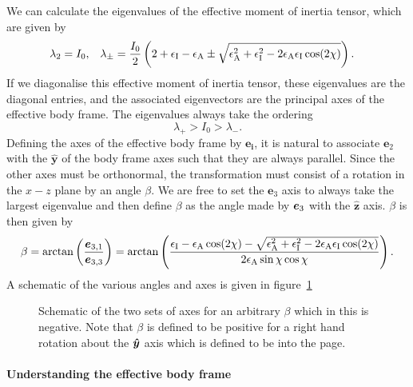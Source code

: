 \documentclass[../full_thesis/full_thesis.tex]{subfiles}
\newcommand{\thisdir}{../rotating_frame}
\begin{document}
We can calculate the eigenvalues of the effective moment of inertia tensor, which are given by
\begin{align}
\lambda_{2}=I_{0}, &&&
\lambda_{\pm}=\frac{I_{0}}{2}
\left(2+\epsilon_{\mathrm{I}}-\epsilon_{\mathrm{A}}\pm
\sqrt{\epsilon_{\mathrm{A}}^{2}+\epsilon_{\mathrm{I}}^{2}-2\epsilon_{\mathrm{A}}\epsilon_{\mathrm{I}}\cos(2\chi)}\right).
\end{align}
If we diagonalise this effective moment of inertia tensor, these eigenvalues
are the diagonal entries, and the associated eigenvectors are the principal
axes of the effective body frame. The eigenvalues always take the ordering
\begin{equation}
\lambda_{+}>I_{0}>\lambda_{-}.
\end{equation}
Defining the axes of the effective body frame by $\boldsymbol{e_{i}}$, it is natural to
associate $\boldsymbol{e}_{2}$ with the
$\boldsymbol{\hat{y}}$ of the body frame axes such that they are always
parallel. Since the other axes must be orthonormal, the transformation must
consist of a rotation in the $x-z$ plane by an angle $\beta$. We are
free to set the $\boldsymbol{e}_{3}$ axis to always take the largest eigenvalue
and then define $\beta$ as the angle made by $\boldsymbol{e}_{3}$ with the
$\hat{\boldsymbol{z}}$ axis. $\beta$ is then given by
\begin{equation}
\beta = \arctan\left(\frac{\boldsymbol{e}_{3,1}}{\boldsymbol{e}_{3,3}}\right)
=\arctan\left( \frac{ \epsilon_{\mathrm{I}}-\epsilon_{\mathrm{A}}\cos(2\chi)-
              \sqrt{\epsilon_{\mathrm{A}}^{2}+\epsilon_{\mathrm{I}}^{2}-2\epsilon_{\mathrm{A}}\epsilon_{\mathrm{I}}\cos(2\chi)}}
              {2\epsilon_{\mathrm{A}}\sin\chi \cos\chi}\right).
\label{eqn: beta}
\end{equation}
A schematic of the various angles and axes is given in
figure~\ref{fig: schematic}
\begin{figure}[ht]
\centering
 
\caption{Schematic of the two sets of axes for an arbitrary $\beta$ which in this
is negative. Note that
$\beta$ is defined to be positive for a right hand rotation about the $\boldsymbol{\hat{y}}$ axis
which is defined to be into the page.}
\label{fig: schematic}
\end{figure}

\paragraph{Understanding the effective body frame}
\end{document}

